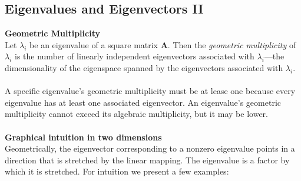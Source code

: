 \documentclass{report}
\begin{document}
\subsection{Eigenvalues and Eigenvectors II} %
\textbf{Geometric Multiplicity}\\
Let $\lambda_i$ be an eigenvalue of a square matrix $\bm{A}$. Then the \textit{geometric multiplicity} of
$\lambda_i$ is the number of linearly independent eigenvectors associated with $\lambda_i$---the dimensionality of 
the eigenspace spanned by the eigenvectors associated
with $\lambda_i$.\\
\vspace{1mm}\\
A specific eigenvalue's geometric multiplicity must be at lease one because every eigenvalue has at least one
associated eigenvector. An eigenvalue's geometric multiplicity cannot exceed its algebraic multiplicity, but it may
be lower.\\
\vspace{1mm}\\
\textbf{Graphical intuition in two dimensions}\\
Geometrically, the eigenvector corresponding to a nonzero eigenvalue points in a direction that 
is stretched by the linear mapping. The eigenvalue is a factor by which it is stretched. 
For intuition we present a few examples:
\end{document}
